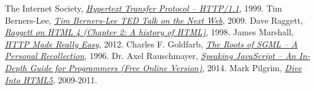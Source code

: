 
\begin{thebibliography}{99}

  The Internet Society,
  \emph{\href{http://tools.ietf.org/html/rfc2616}{Hypertext Transfer Protocol -- HTTP/1.1}},  
  1999.
  Tim Berners-Lee,
  \emph{\href{http://www.ted.com/talks/tim_berners_lee_on_the_next_web?language=en}{Tim Berners-Lee TED Talk on the Next Web}},  
  2009.
  Dave Raggett,
  \emph{\href{http://www.w3.org/People/Raggett/book4/ch02.html}{Raggett on HTML 4 (Chapter 2: A history of HTML)}},  
  1998.
  James Marshall,
  \emph{\href{http://www.jmarshall.com/easy/http/}{HTTP Made Really Easy}},  
  2012.
Charles F. Goldfarb,
\emph{\href{http://www.sgmlsource.com/history/roots.htm}{The Roots of SGML -- A Personal Recollection}},  
1996.
Dr. Axel Rauschmayer,
\emph{\href{http://speakingjs.com/es5/}{Speaking JavaScript -- An In-Depth Guide for Programmers (Free Online Version)}},  
2014.
Mark Pilgrim,
\emph{\href{http://diveintohtml5.info/index.html}{Dive Into HTML5}},  
2009-2011.
\end{thebibliography}